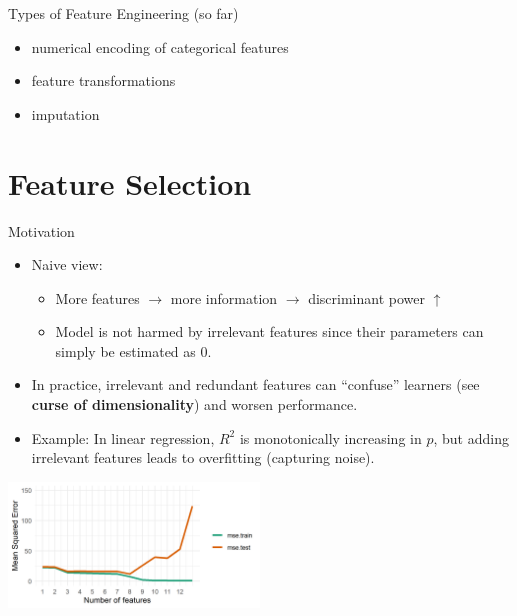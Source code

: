 \documentclass[11pt,compress,t,notes=noshow, xcolor=table]{beamer}
\begin{document}
\begin{frame}{Types of Feature Engineering (so far)}
\begin{itemize}
    \item numerical encoding of categorical features
    \item feature transformations
    \item imputation
\end{itemize}
\end{frame}

\section{Feature Selection}

\begin{vbframe}{Motivation}
\begin{itemize}
\setlength{\itemsep}{0.8em}
    \item Naive view:
    \begin{itemize}
        \item More features $\rightarrow$ more information $\rightarrow$ discriminant power $\uparrow$
        \item Model is not harmed by irrelevant features since their parameters can simply be estimated as 0.
    \end{itemize}
    \item In practice, irrelevant and redundant features can \enquote{confuse} learners (see \textbf{curse of dimensionality}) and worsen performance.
    \item Example: In linear regression, $R^2$ is monotonically increasing in $p$, but adding irrelevant features leads to overfitting (capturing noise). %
\end{itemize}

\begin{center}
    \includegraphics[width = 0.5\textwidth]{sl/feature-selection/figure/avoid_overfitting_02.png}\\
\end{center}


\end{vbframe}
\end{document}
